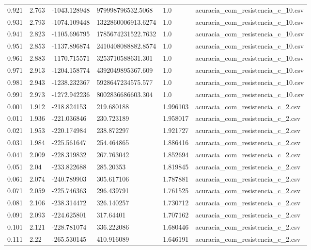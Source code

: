 \begin{table}
\begin{tabular}{llllll}
0.921 & 2.763 & -1043.128948 & 979998796532.5068 & 1.0 & acuracia\_com\_resistencia\_c\_10.csv \\
0.931 & 2.793 & -1074.109448 & 1322860006913.6274 & 1.0 & acuracia\_com\_resistencia\_c\_10.csv \\
0.941 & 2.823 & -1105.696795 & 1785674231522.7632 & 1.0 & acuracia\_com\_resistencia\_c\_10.csv \\
0.951 & 2.853 & -1137.896874 & 2410408088882.8574 & 1.0 & acuracia\_com\_resistencia\_c\_10.csv \\
0.961 & 2.883 & -1170.715571 & 3253710588631.301 & 1.0 & acuracia\_com\_resistencia\_c\_10.csv \\
0.971 & 2.913 & -1204.158774 & 4392049895367.609 & 1.0 & acuracia\_com\_resistencia\_c\_10.csv \\
0.981 & 2.943 & -1238.232367 & 5928647234575.577 & 1.0 & acuracia\_com\_resistencia\_c\_10.csv \\
0.991 & 2.973 & -1272.942236 & 8002836686603.304 & 1.0 & acuracia\_com\_resistencia\_c\_10.csv \\
0.001 & 1.912 & -218.824153 & 219.680188 & 1.996103 & acuracia\_com\_resistencia\_c\_2.csv \\
0.011 & 1.936 & -221.036846 & 230.723189 & 1.958017 & acuracia\_com\_resistencia\_c\_2.csv \\
0.021 & 1.953 & -220.174984 & 238.872297 & 1.921727 & acuracia\_com\_resistencia\_c\_2.csv \\
0.031 & 1.984 & -225.561647 & 254.464865 & 1.886416 & acuracia\_com\_resistencia\_c\_2.csv \\
0.041 & 2.009 & -228.319832 & 267.763042 & 1.852694 & acuracia\_com\_resistencia\_c\_2.csv \\
0.051 & 2.04 & -233.822688 & 285.20353 & 1.819845 & acuracia\_com\_resistencia\_c\_2.csv \\
0.061 & 2.074 & -240.789903 & 305.617106 & 1.787881 & acuracia\_com\_resistencia\_c\_2.csv \\
0.071 & 2.059 & -225.746363 & 296.439791 & 1.761525 & acuracia\_com\_resistencia\_c\_2.csv \\
0.081 & 2.106 & -238.314472 & 326.140257 & 1.730712 & acuracia\_com\_resistencia\_c\_2.csv \\
0.091 & 2.093 & -224.625801 & 317.64401 & 1.707162 & acuracia\_com\_resistencia\_c\_2.csv \\
0.101 & 2.121 & -228.781074 & 336.222086 & 1.680446 & acuracia\_com\_resistencia\_c\_2.csv \\
0.111 & 2.22 & -265.530145 & 410.916089 & 1.646191 & acuracia\_com\_resistencia\_c\_2.csv \\

\end{tabular}
\end{table}

